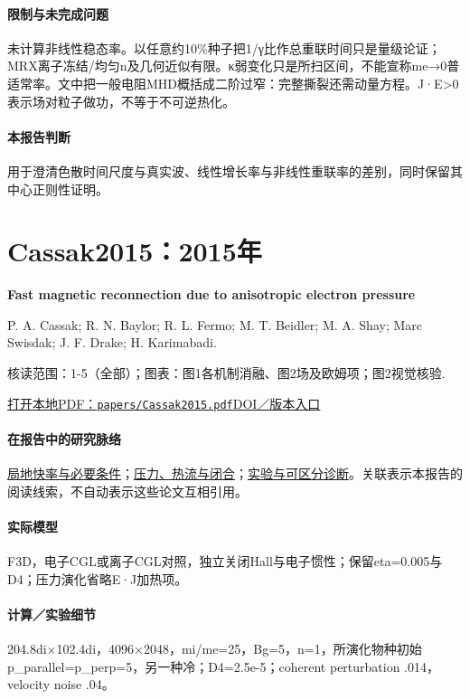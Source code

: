 \paragraph{限制与未完成问题}未计算非线性稳态率。以任意约10\%种子把1/γ比作总重联时间只是量级论证；MRX离子冻结/均匀n及几何近似有限。κ弱变化只是所扫区间，不能宣称me→0普适常率。文中把一般电阻MHD概括成二阶过窄：完整撕裂还需动量方程。J·E>0表示场对粒子做功，不等于不可逆热化。

\paragraph{本报告判断}用于澄清色散时间尺度与真实波、线性增长率与非线性重联率的差别，同时保留其中心正则性证明。

\section{Cassak2015：2015年}\label{paper:Cassak2015}

\textbf{Fast magnetic reconnection due to anisotropic electron pressure}\citep{Cassak2015}\

P. A. Cassak;  R. N. Baylor;  R. L. Fermo;  M. T. Beidler;  M. A. Shay;  Marc Swisdak;  J. F. Drake;  H. Karimabadi.

\textsf{核读范围：}1-5（全部）；\textsf{图表：}图1各机制消融、图2场及欧姆项；图2视觉核验.

\href{run:papers/Cassak2015.pdf}{打开本地PDF：\texttt{papers/Cassak2015.pdf}}\quad\href{https://doi.org/10.1063/1.4908545}{DOI／版本入口}

\paragraph{在报告中的研究脉络}\hyperref[story:fast]{局地快率与必要条件}；\hyperref[story:closure]{压力、热流与闭合}；\hyperref[story:diagnostic]{实验与可区分诊断}。关联表示本报告的阅读线索，不自动表示这些论文互相引用。

\paragraph{实际模型}F3D，电子CGL或离子CGL对照，独立关闭Hall与电子惯性；保留eta=0.005与D4；压力演化省略E·J加热项。

\paragraph{计算／实验细节}204.8di×102.4di，4096×2048，mi/me=25，Bg=5，n=1，所演化物种初始p\_parallel=p\_perp=5，另一种冷；D4=2.5e-5；coherent perturbation .014，velocity noise .04。

